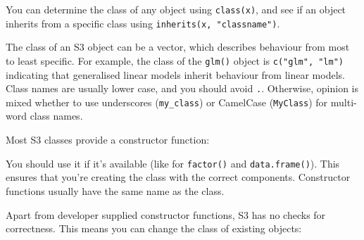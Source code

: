 You can determine the class of any object using \texttt{class(x)}, and
see if an object inherits from a specific class using
\texttt{inherits(x, "classname")}. 

\begin{Shaded}
\begin{Highlighting}[]
\NormalTok{)}
\end{Highlighting}
\end{Shaded}

The class of an S3 object can be a vector, which describes behaviour
from most to least specific. For example, the class of the
\texttt{glm()} object is \texttt{c("glm", "lm")} indicating that
generalised linear models inherit behaviour from linear models. Class
names are usually lower case, and you should avoid \texttt{.}.
Otherwise, opinion is mixed whether to use underscores
(\texttt{my\_class}) or CamelCase (\texttt{MyClass}) for multi-word
class names.

Most S3 classes provide a constructor function:

\begin{Shaded}
\begin{Highlighting}[]
\StringTok{ }
  \NormalTok{(}\NormalTok{)}
  \NormalTok{(} \NormalTok{)}
\NormalTok{\}}
\end{Highlighting}
\end{Shaded}

You should use it if it's available (like for \texttt{factor()} and
\texttt{data.frame()}). This ensures that you're creating the class with
the correct components. Constructor functions usually have the same name
as the class.

Apart from developer supplied constructor functions, S3 has no checks
for correctness. This means you can change the class of existing
objects:

